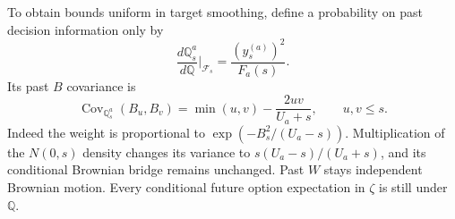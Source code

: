 \documentclass[11pt,a4paper]{amsart}
\theoremstyle{plain}
\theoremstyle{definition}
\theoremstyle{remark}
\DeclareMathOperator{\Cov}{Cov}
\newcommand{\QQ}{\mathbb{Q}}
\newcommand{\F}{\mathcal F}
\begin{document}
To obtain bounds uniform in target smoothing, define a probability on past decision information only by
\begin{equation}\label{eq:past-tilt}
 \frac{d\QQ_s^a}{d\QQ}\bigg|_{\F_s}
       =\frac{(y_s^{(a)})^2}{F_a(s)}.
\end{equation}
Its past $B$ covariance is
\begin{equation}\label{eq:contracted-covariance}
 \Cov_{\QQ_s^a}(B_u,B_v)=\min(u,v)-\frac{2uv}{U_a+s},
 \qquad u,v\le s.
\end{equation}
Indeed the weight is proportional to $\exp(-B_s^2/(U_a-s))$. Multiplication of the $N(0,s)$ density changes its variance to $s(U_a-s)/(U_a+s)$, and its conditional Brownian bridge remains unchanged. Past $W$ stays independent Brownian motion. Every conditional future option expectation in $\zeta$ is still under $\QQ$.
\end{document}
